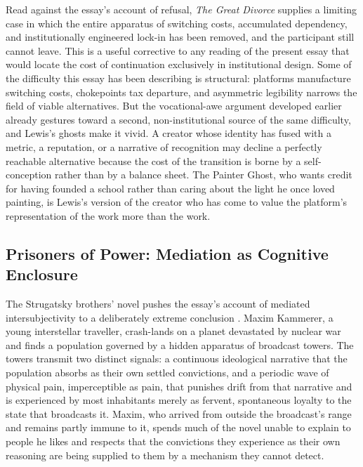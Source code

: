 \documentclass[11pt]{article}
\begin{document}
Read against the essay's account of refusal, \emph{The Great Divorce} supplies a limiting case in which the entire apparatus of switching costs, accumulated dependency, and institutionally engineered lock-in has been removed, and the participant still cannot leave. This is a useful corrective to any reading of the present essay that would locate the cost of continuation exclusively in institutional design. Some of the difficulty this essay has been describing is structural: platforms manufacture switching costs, chokepoints tax departure, and asymmetric legibility narrows the field of viable alternatives. But the vocational-awe argument developed earlier already gestures toward a second, non-institutional source of the same difficulty, and Lewis's ghosts make it vivid. A creator whose identity has fused with a metric, a reputation, or a narrative of recognition may decline a perfectly reachable alternative because the cost of the transition is borne by a self-conception rather than by a balance sheet. The Painter Ghost, who wants credit for having founded a school rather than caring about the light he once loved painting, is Lewis's version of the creator who has come to value the platform's representation of the work more than the work.

\subsection{Prisoners of Power: Mediation as Cognitive Enclosure}

The Strugatsky brothers' novel pushes the essay's account of mediated intersubjectivity to a deliberately extreme conclusion \parencite{strugatsky1971prisoners}. Maxim Kammerer, a young interstellar traveller, crash-lands on a planet devastated by nuclear war and finds a population governed by a hidden apparatus of broadcast towers. The towers transmit two distinct signals: a continuous ideological narrative that the population absorbs as their own settled convictions, and a periodic wave of physical pain, imperceptible as pain, that punishes drift from that narrative and is experienced by most inhabitants merely as fervent, spontaneous loyalty to the state that broadcasts it. Maxim, who arrived from outside the broadcast's range and remains partly immune to it, spends much of the novel unable to explain to people he likes and respects that the convictions they experience as their own reasoning are being supplied to them by a mechanism they cannot detect.
\end{document}
